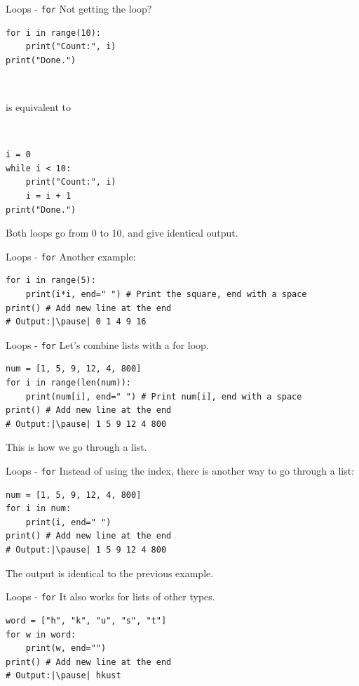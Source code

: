 \documentclass[dvipsnames, svgnames, x11names]{beamer}
\begin{document}
\begin{frame}[fragile]{Loops - \texttt{for}}
Not getting the loop?
\begin{verbatim}
for i in range(10):
    print("Count:", i)
print("Done.")
\end{verbatim}

\

is equivalent to

\

\begin{verbatim}
i = 0
while i < 10:
    print("Count:", i)
    i = i + 1
print("Done.")
\end{verbatim}

Both loops go from 0 to 10, and give identical output.
\end{frame}

\begin{frame}[fragile]{Loops - \texttt{for}}
Another example:
\begin{verbatim}
for i in range(5):
    print(i*i, end=" ") # Print the square, end with a space
print() # Add new line at the end
# Output:|\pause| 0 1 4 9 16
\end{verbatim}
\end{frame}

\begin{frame}[fragile]{Loops - \texttt{for}}
Let's combine lists with a for loop.
\begin{verbatim}
num = [1, 5, 9, 12, 4, 800]
for i in range(len(num)):
    print(num[i], end=" ") # Print num[i], end with a space
print() # Add new line at the end
# Output:|\pause| 1 5 9 12 4 800
\end{verbatim}
\pause This is how we go through a list.
\end{frame}

\begin{frame}[fragile]{Loops - \texttt{for}}
Instead of using the index, there is another way to go through a list:
\begin{verbatim}
num = [1, 5, 9, 12, 4, 800]
for i in num:
    print(i, end=" ")
print() # Add new line at the end
# Output:|\pause| 1 5 9 12 4 800
\end{verbatim}
\pause The output is identical to the previous example.
\end{frame}

\begin{frame}[fragile]{Loops - \texttt{for}}
It also works for lists of other types.
\begin{verbatim}
word = ["h", "k", "u", "s", "t"]
for w in word:
    print(w, end="")
print() # Add new line at the end
# Output:|\pause| hkust
\end{verbatim}
\end{frame}
\end{document}
